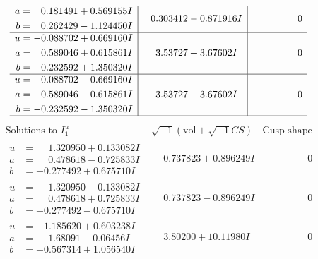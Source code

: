 \documentclass[1p]{elsarticle_modified}
\theoremstyle{definition}
\newcommand{\I}{\sqrt{-1}}
\begin{document}
$$\begin{array}{c|c|c}
\begin{aligned}
a &= \phantom{-}0.181491 + 0.569155 I \\
b &= \phantom{-}0.262429 - 1.124450 I\end{aligned}
 & \phantom{-}0.303412 - 0.871916 I & \phantom{-0.000000 } 0 \\ \hline\begin{aligned}
u &= -0.088702 + 0.669160 I \\
a &= \phantom{-}0.589046 + 0.615861 I \\
b &= -0.232592 + 1.350320 I\end{aligned}
 & \phantom{-}3.53727 + 3.67602 I & \phantom{-0.000000 } 0 \\ \hline\begin{aligned}
u &= -0.088702 - 0.669160 I \\
a &= \phantom{-}0.589046 - 0.615861 I \\
b &= -0.232592 - 1.350320 I\end{aligned}
 & \phantom{-}3.53727 - 3.67602 I & \phantom{-0.000000 } 0\\
 \hline 
 \end{array}$$\newpage$$\begin{array}{c|c|c}  
\text{Solutions to }I^u_{1}& \I (\text{vol} + \sqrt{-1}CS) & \text{Cusp shape}\\
 \hline 
\begin{aligned}
u &= \phantom{-}1.320950 + 0.133082 I \\
a &= \phantom{-}0.478618 - 0.725833 I \\
b &= -0.277492 + 0.675710 I\end{aligned}
 & \phantom{-}0.737823 + 0.896249 I & \phantom{-0.000000 } 0 \\ \hline\begin{aligned}
u &= \phantom{-}1.320950 - 0.133082 I \\
a &= \phantom{-}0.478618 + 0.725833 I \\
b &= -0.277492 - 0.675710 I\end{aligned}
 & \phantom{-}0.737823 - 0.896249 I & \phantom{-0.000000 } 0 \\ \hline\begin{aligned}
u &= -1.185620 + 0.603238 I \\
a &= \phantom{-}1.68091 - 0.06456 I \\
b &= -0.567314 + 1.056540 I\end{aligned}
 & \phantom{-}3.80200 + 10.11980 I & \phantom{-0.000000 } 0 \\ \hline\begin{aligned}

\end{aligned}
\end{array}$$
\end{document}

